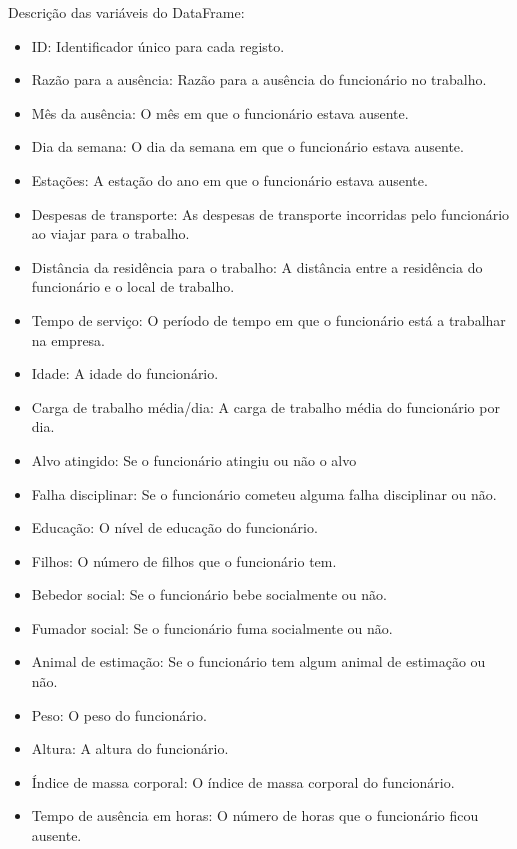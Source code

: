 \documentclass[11pt]{article}
\providecommand{\tightlist}{%
      \setlength{\itemsep}{0pt}\setlength{\parskip}{0pt}}
\begin{document}
  
Descrição das variáveis do DataFrame:

\begin{itemize}
\tightlist
\item
  ID: Identificador único para cada registo.
\item
  Razão para a ausência: Razão para a ausência do funcionário no
  trabalho.
\item
  Mês da ausência: O mês em que o funcionário estava ausente.
\item
  Dia da semana: O dia da semana em que o funcionário estava ausente.
\item
  Estações: A estação do ano em que o funcionário estava ausente.
\item
  Despesas de transporte: As despesas de transporte incorridas pelo
  funcionário ao viajar para o trabalho.
\item
  Distância da residência para o trabalho: A distância entre a
  residência do funcionário e o local de trabalho.
\item
  Tempo de serviço: O período de tempo em que o funcionário está a
  trabalhar na empresa.
\item
  Idade: A idade do funcionário.
\item
  Carga de trabalho média/dia: A carga de trabalho média do funcionário
  por dia.
\item
  Alvo atingido: Se o funcionário atingiu ou não o alvo
\item
  Falha disciplinar: Se o funcionário cometeu alguma falha disciplinar
  ou não.
\item
  Educação: O nível de educação do funcionário.
\item
  Filhos: O número de filhos que o funcionário tem.
\item
  Bebedor social: Se o funcionário bebe socialmente ou não.
\item
  Fumador social: Se o funcionário fuma socialmente ou não.
\item
  Animal de estimação: Se o funcionário tem algum animal de estimação ou
  não.
\item
  Peso: O peso do funcionário.
\item
  Altura: A altura do funcionário.
\item
  Índice de massa corporal: O índice de massa corporal do funcionário.
\item
  Tempo de ausência em horas: O número de horas que o funcionário ficou
  ausente.
\end{itemize}
\end{document}
